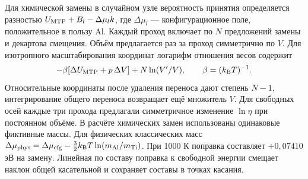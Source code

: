 Для химической замены в случайном узле вероятность принятия определяется
разностью \(U_{\rm MTP}+B_l-\Delta\mu_l k\), где \(\Delta\mu_l\) —
конфигурационное поле, положительное в пользу Al. Каждый проход включает
по \(N\) предложений замены и декартова смещения. Объём предлагается раз
за проход симметрично по \(V\). Для изотропного масштабирования координат
логарифм отношения весов содержит
\[
 -\beta[\Delta U_{\rm MTP}+p\,\Delta V]+N\ln(V'/V),
 \qquad \beta=(k_{\rm B}T)^{-1}.
\]
Относительные координаты после удаления переноса дают степень \(N-1\),
интегрирование общего переноса возвращает ещё множитель \(V\).
Для свободных осей каждые три прохода предлагали симметричное изменение
\(\ln\eta\) при постоянном объёме. В расчёте химических замен использованы
одинаковые фиктивные массы. Для физических классических масс
\(\Delta\mu_{\rm phys}=\Delta\mu_{\rm cfg}
 -\tfrac32 k_{\rm B}T\ln(m_{\rm Al}/m_{\rm Ti})\).
При 1000 К поправка составляет \(+0{,}07410\) эВ на замену.
Линейная по составу поправка к свободной энергии смещает наклон общей
касательной и сохраняет составы в точках касания.

